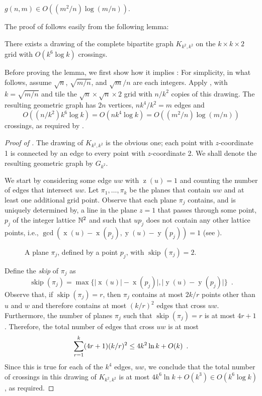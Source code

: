 \documentclass{patmorin}
\DeclareMathOperator{\x}{x}
\DeclareMathOperator{\y}{y}
\DeclareMathOperator{\z}{z}
\DeclareMathOperator{\skp}{skip}
\begin{document}
\begin{thm}
  $g(n,m) \in O((m^2/n)\log (m/n))$.
\end{thm}

The proof of  follows easily from the following lemma:
\begin{lem}
  There exists a drawing of the complete bipartite graph $K_{k^2,k^2}$
  on the $k\times k\times 2$ grid with $O(k^6\log k)$ crossings.
\end{lem}

Before proving the lemma, we first show how it implies
: For simplicity, in what follows, assume $\sqrt{n}$,
$\sqrt{m/n}$, and $\sqrt{m}/n$ are each integers.  Apply ,
with $k=\sqrt{m/n}$ and tile the $\sqrt{n}\times\sqrt{n}\times 2$ grid
with $n/k^2$ copies of this drawing. The resulting geometric graph has
$2n$ vertices, $nk^4/k^2=m$ edges and
\[ O((n/k^2)k^6\log k) = O(nk^4\log k) = O((m^2/n)\log(m/n))
\] 
crossings, as required by .

\begin{proof}[Proof of ]
The drawing of $K_{k^2,k^2}$ is the obvious one; each point with
$z$-coordinate 1 is connected by an edge to every point with
$z$-coordinate 2.  We shall denote the resulting geometric graph
by $G_{k^2}$.

We start by considering some edge $uw$ with $\z(u)=1$ and counting
the number of edges that intersect $uw$.  Let $\pi_1,\ldots,\pi_k$ be
the planes that contain $uw$ and at least one additional grid point.
Observe that each plane $\pi_j$ contains, and is uniquely determined by,
a line in the plane $z=1$ that passes through some point, $p_j$ of the
integer lattice $\mathbb{N}^2$ and such that $up_j$ does not contain any other
lattice points, i.e., $\gcd(\x(u)-\x(p_j),\y(u)-\y(p_j))=1$ (see ).
\begin{figure}
  \caption{A plane $\pi_j$, defined by a point $p_j$, with $\skp(\pi_j)=2$.}
\end{figure}
Define the \emph{skip} of $\pi_j$ as
\[
   \skp(\pi_j)=\max\{|\x(u)|-\x(p_j)|,|\y(u)-\y(p_j)|\} \enspace .
\]
Observe that, if $\skp(\pi_j)=r$, then $\pi_j$ contains at most $2k/r$
points other than $u$ and $w$ and therefore contains at most $(k/r)^2$
edges that cross $uw$.  Furthermore, the number of planes $\pi_j$ such
that $\skp(\pi_j)=r$ is at most $4r+1$.  Therefore, the total number
of edges that cross $uw$ is at most
\begin{equation}
   \sum_{r=1}^k (4r+1)(k/r)^2 \le 4k^2\ln k + O(k) \enspace . \eqlabel{critical}
\end{equation}
Since this is true for each of the $k^4$ edges, $uw$, we conclude that
the total number of crossings in this drawing of $K_{k^2,k^2}$ is at
most $4k^6\ln k+O(k^3)\in O(k^6\log k)$, as required.
\end{proof}
\end{document}
